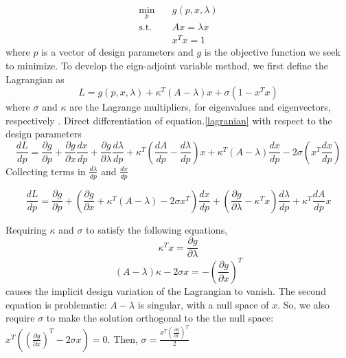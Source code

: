 \documentclass{tufte-handout}
\begin{document}
\begin{equation}\label{opt_problem}
\begin{aligned}
\min_{p} \quad & g(p,x,\lambda) \\
\textrm{s.t.} \quad &  A x = \lambda x \\ & 
  x^T x = 1
\end{aligned}
\end{equation}
where $p$ is a vector of design parameters and $g$ is the objective function we seek to minimize. To develop the eign-adjoint variable method, we first define the Lagrangian  as
\begin{equation}\label{lagranian}
L=  g(p,x,\lambda) + \kappa^T(A- \lambda)x + \sigma (1-x^T x) 
\end{equation} 
 where $\sigma$ and  $\kappa$  are the Lagrange multipliers, for eigenvalues and eigenvectors, respectively .  Direct differentiation of equation.\ref{lagranian} with respect to the design parameters 
 \begin{equation}
 \frac{d L}{d p} = \frac{\partial g}{\partial p} + \frac{\partial g}{\partial x} \frac{d x}{d p}+ \frac{\partial g}{\partial \lambda} \frac{d \lambda}{d p} + \kappa^T \left( \frac{d A}{d p}- \frac{d \lambda}{d p}\right)  x + \kappa^T \left( A- \lambda \right) \frac{d x}{d p } -2  \sigma \left( x^T \frac{d x}{d p } \right)  
 \end{equation}
 Collecting terms in $\frac{d \lambda}{d p }$ and $\frac{d x }{d p}$ 
 
  \begin{equation}
  \frac{d L}{d p} = \frac{\partial g}{\partial p} + \left(  \frac{\partial g}{\partial x} + \kappa^T (A-\lambda) -2 \sigma x^T \right)  \frac{d x}{d p}+ \left(   \frac{\partial g}{\partial \lambda}- \kappa^T x  \right)  \frac{d \lambda}{d p} + \kappa^T  \frac{d A}{d p}  x  
  \end{equation}
  
  Requiring $\kappa$ and $\sigma$ to satisfy the following equations,  
  \begin{equation}
 \kappa^T x   =  \frac{\partial g}{\partial \lambda}
  \end{equation}
  \begin{equation}\label{11}
  (A-\lambda) \kappa -2 \sigma x   = -\left(  \frac{\partial g}{\partial x} \right) ^T
  \end{equation}
causes the  implicit design variation of the
Lagrangian to vanish. The second equation is problematic: $A - \lambda$ is singular, with a null space of $x$. So, we  also require $\sigma$  to make the solution orthogonal to the  the null space:
$x^T \left( \left(  \frac{\partial g}{\partial x} \right) ^T -2 \sigma x \right)  = 0  $. Then, $\sigma = \frac{x^T \left( \frac{\partial g}{\partial x} \right)^T }{2}$
\end{document}
